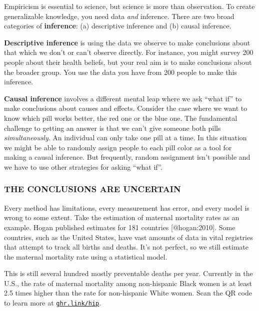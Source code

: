 \documentclass[
  letterpaper,
  DIV=11,
  numbers=noendperiod,
  oneside]{scrartcl}
\begin{document}
Empiricism is essential to science, but science is more than
observation. To create generalizable knowledge, you need data \emph{and}
inference. There are two broad categories of \textbf{inference}: (a)
descriptive inference and (b) causal inference.

\textbf{Descriptive inference} is using the data we observe to make
conclusions about that which we don't or can't observe directly. For
instance, you might survey 200 people about their health beliefs, but
your real aim is to make conclusions about the broader group. You use
the data you have from 200 people to make this inference.

\textbf{Causal inference} involves a different mental leap where we ask
``what if'' to make conclusions about causes and effects. Consider the
case where we want to know which pill works better, the red one or the
blue one. The fundamental challenge to getting an answer is that we
can't give someone both pills \emph{simultaneously}. An individual can
only take one pill at a time. In this situation we might be able to
randomly assign people to each pill color as a tool for making a causal
inference. But frequently, random assignment isn't possible and we have
to use other strategies for asking ``what if''.

\hypertarget{the-conclusions-are-uncertain}{%
\subsubsection*{THE CONCLUSIONS ARE
UNCERTAIN}\label{the-conclusions-are-uncertain}}

Every method has limitations, every measurement has error, and every
model is wrong to some extent. Take the estimation of maternal mortality
rates as an example. Hogan published estimates for 181 countries
{[}@hogan:2010{]}. Some countries, such as the United States, have vast
amounts of data in vital registries that attempt to track all births and
deaths. It's not perfect, so we still estimate the maternal mortality
rate using a statistical model.

 This is still several hundred mostly preventable
deaths per year. Currently in the U.S., the rate of maternal mortality
among non-hispanic Black women is at least 2.5 times higher than the
rate for non-hispanic White women. Scan the QR code to learn more at
\href{http://ghr.link/hip}{\footnotesize\texttt{ghr.link/hip}}.
\end{document}

